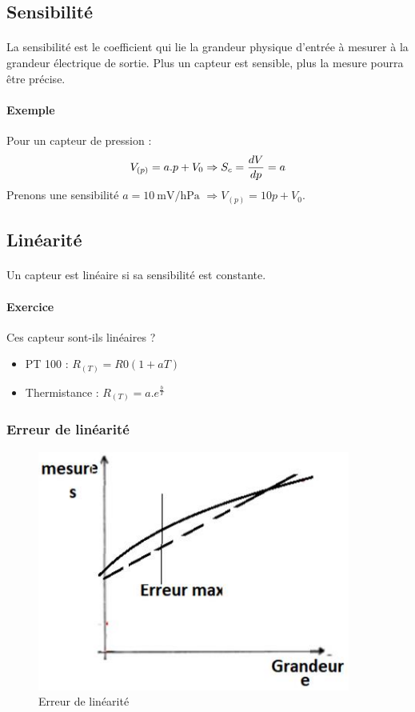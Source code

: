\documentclass{article}
\begin{document}
        \subsection{Sensibilité}
        \paragraph{} La sensibilité est le coefficient qui lie la grandeur physique d'entrée à mesurer à la grandeur électrique de sortie. Plus un capteur est sensible, plus la mesure pourra être précise.

        \paragraph{Exemple}
        Pour un capteur de pression :
        \begin{equation*}
            V_{\left(p\right)} = a . p + V_0\\
            \Rightarrow S_c = \frac{dV}{dp} = a
        \end{equation*}
        Prenons une sensibilité $a = \SI{10}{\milli\volt/\hecto\pascal}$ $\Rightarrow V_{\left(p\right)} = 10p + V_0$.

        \subsection{Linéarité}
        \paragraph{}
        Un capteur est linéaire si sa sensibilité est constante.

        \paragraph{Exercice}
        Ces capteur sont-ils linéaires ?
        \begin{itemize}
            \item PT 100 : $R_{\left(T\right)} = R0\left(1 + aT\right)$
            \item Thermistance : $R_{\left(T\right)} = a.e^{\frac{b}{T}}$
        \end{itemize}

            \subsubsection{Erreur de linéarité}
            \begin{figure}[H]
                \centering
                \includegraphics[width=0.35\linewidth]{./images/004-erreur-linearite.png}
                \caption{Erreur de linéarité}
            \end{figure}
\end{document}
